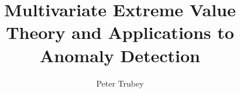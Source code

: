 \documentclass{article}
\title{Multivariate Extreme Value Theory and Applications to Anomaly Detection}
\author{Peter Trubey}
\date{}
\begin{document}
\maketitle
\thispagestyle{empty}
\begin{abstract}
  
\end{abstract}

\newpage

\tableofcontents
\thispagestyle{empty}

\newpage

\clearpage
{}


% 














\newpage



\end{document}
